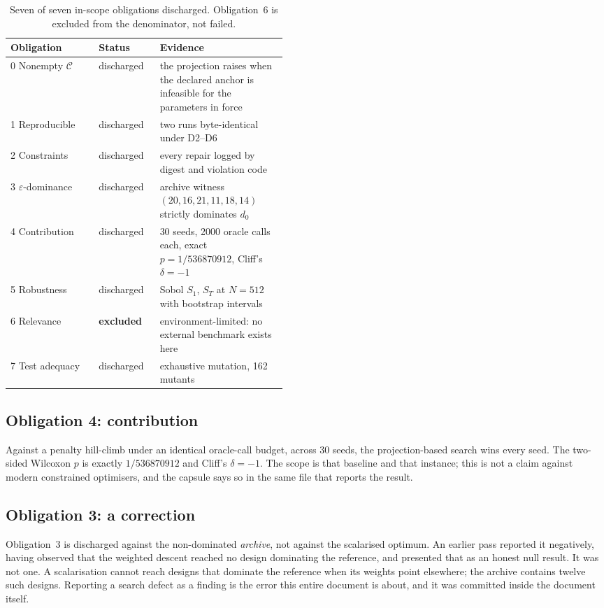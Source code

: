 \documentclass[11pt,a4paper]{article}
\theoremstyle{plain}
\theoremstyle{definition}
\theoremstyle{remark}
\newcommand{\Cfeas}{\mathcal{C}}
\begin{document}
\begin{table}[htbp]\centering\footnotesize
\begin{tabular}{@{}llp{0.46\linewidth}@{}}
\toprule
\textbf{Obligation} & \textbf{Status} & \textbf{Evidence}\\
\midrule
0 Nonempty $\Cfeas$ & discharged & the projection raises when the declared
anchor is infeasible for the parameters in force\\
1 Reproducible & discharged & two runs byte-identical under D2--D6\\
2 Constraints & discharged & every repair logged by digest and violation code\\
3 $\varepsilon$-dominance & discharged & archive witness $(20,16,21,11,18,14)$
strictly dominates $d_0$\\
4 Contribution & discharged & 30 seeds, 2000 oracle calls each, exact
$p = 1/536870912$, Cliff's $\delta = -1$\\
5 Robustness & discharged & Sobol $S_1$, $S_T$ at $N=512$ with bootstrap
intervals\\
6 Relevance & \textbf{excluded} & environment-limited: no external benchmark
exists here\\
7 Test adequacy & discharged & exhaustive mutation, 162 mutants\\
\bottomrule
\end{tabular}
\caption{Seven of seven in-scope obligations discharged. Obligation~6 is
excluded from the denominator, not failed.}
\end{table}

\subsection{Obligation 4: contribution}
Against a penalty hill-climb under an identical oracle-call budget, across 30
seeds, the projection-based search wins every seed. The two-sided Wilcoxon
$p$ is exactly $1/536870912$ and Cliff's $\delta = -1$. The scope is that
baseline and that instance; this is not a claim against modern constrained
optimisers, and the capsule says so in the same file that reports the result.

\subsection{Obligation 3: a correction}
Obligation~3 is discharged against the non-dominated \emph{archive}, not
against the scalarised optimum. An earlier pass reported it negatively, having
observed that the weighted descent reached no design dominating the reference,
and presented that as an honest null result. It was not one. A scalarisation
cannot reach designs that dominate the reference when its weights point
elsewhere; the archive contains twelve such designs. Reporting a search
defect as a finding is the error this entire document is about, and it was
committed inside the document itself.
\end{document}

